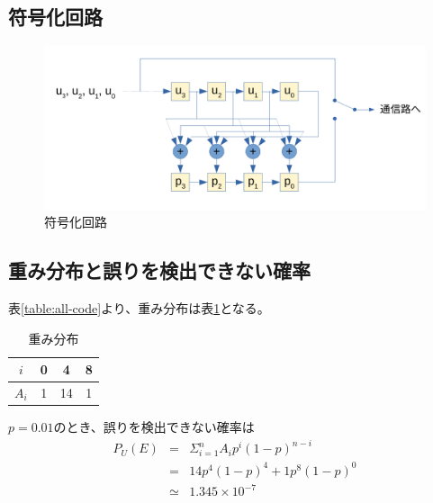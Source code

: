 \documentclass[a4paper,11pt]{jsarticle}
\begin{document}
\subsection{符号化回路}

\begin{figure}[htbp]
  \begin{center}
  \includegraphics[scale=0.7]{figures/circuit001.pdf}
  \end{center}
  \caption{符号化回路
  \label{fig:pm1}
  }
\end{figure}

\subsection{重み分布と誤りを検出できない確率}
表\ref{table:all-code}より、重み分布は表\ref{table:weight-dist}となる。

\begin{table}[hbtp]
  \caption{重み分布}
  \label{table:weight-dist}
  \centering
  \begin{tabular}{|c|ccc|}
    \hline
    $i$ & 0 & 4 & 8 \\ \hline
    $A_i$ & 1 & 14 & 1 \\ \hline
  \end{tabular}
\end{table}

$p=0.01$のとき、誤りを検出できない確率は
\begin{eqnarray*}
  P_U(E) &=& \Sigma_{i=1}^{n}{A_ip^i(1-p)^{n-i}} \\
  &=& 14p^4(1-p)^4+1p^8(1-p)^0 \\
  &\simeq& 1.345 \times 10^{-7}
\end{eqnarray*}
\end{document}
